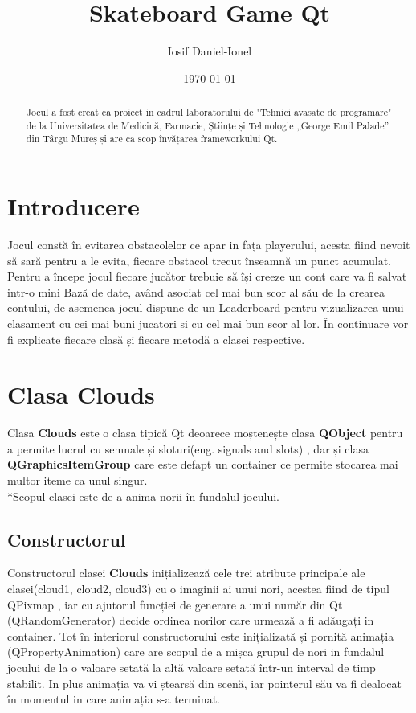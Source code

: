 \documentclass{article}
\begin{document}
\title{\Huge Skateboard Game Qt}
\author{Iosif Daniel-Ionel}
\date{\today}
\maketitle

\begin{abstract}
Jocul a fost creat ca proiect in cadrul laboratorului de  "Tehnici avasate de programare"  de la Universitatea de Medicină, Farmacie, Științe și Tehnologie „George Emil Palade” din Târgu Mureș și are ca scop învățarea frameworkului Qt. 
\end{abstract}

\newpage
\tableofcontents
\section{Introducere}
Jocul constă în evitarea obstacolelor ce apar in fața playerului, acesta fiind nevoit să sară pentru a le evita, fiecare obstacol trecut înseamnă un punct acumulat.
Pentru a începe jocul fiecare jucător trebuie să își creeze un cont care va fi salvat intr-o mini Bază de date, având asociat cel mai bun scor al său de la crearea contului, de asemenea jocul dispune de un Leaderboard pentru  vizualizarea unui clasament cu cei mai buni jucatori si cu cel mai bun scor al lor.
În continuare vor fi explicate fiecare clasă și fiecare metodă a clasei respective.

\section{Clasa Clouds}
Clasa \textbf{Clouds} este o clasa tipică Qt deoarece moștenește clasa \textbf{QObject} pentru a permite lucrul cu semnale și sloturi(eng. signals and slots) , dar și clasa \textbf{QGraphicsItemGroup} care este defapt un container ce permite stocarea mai multor iteme ca unul singur.
\\*Scopul clasei este de a anima norii în fundalul jocului.

\subsection{Constructorul}
Constructorul clasei \textbf{Clouds} inițializează cele trei atribute principale ale clasei(cloud1, cloud2, cloud3) cu o imaginii ai unui nori, acestea fiind de tipul QPixmap , iar cu ajutorul funcției de generare a unui număr din Qt (QRandomGenerator) decide ordinea norilor care urmează a fi adăugați in container. Tot în interiorul constructorului este inițializată și pornită animația (QPropertyAnimation) care are scopul de a mișca grupul de nori in fundalul jocului de la o valoare setată la altă valoare setată într-un interval de timp stabilit. In plus animația va vi ștearsă din scenă, iar pointerul său va fi dealocat în momentul in care animația s-a terminat.
\end{document}
